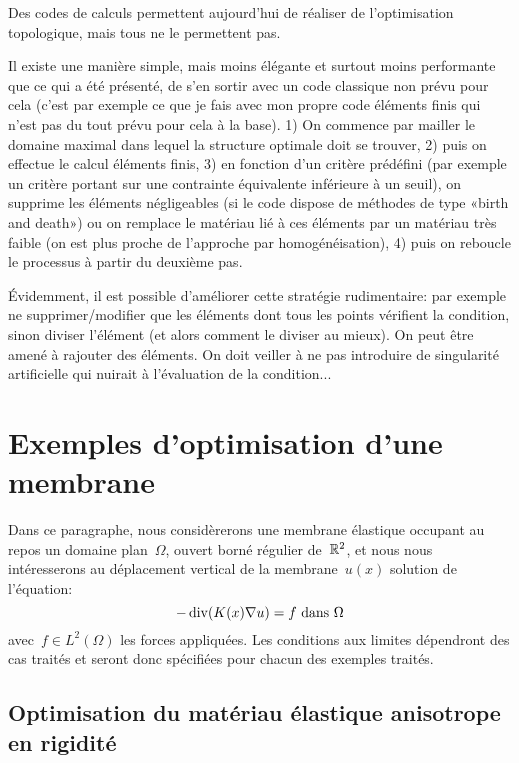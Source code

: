 \begin{remarque}
Des codes de calculs permettent aujourd'hui de réaliser de l'optimisation topologique, mais tous ne le permettent pas.

Il existe une manière simple, mais moins élégante et surtout moins performante que ce qui a été présenté, de s'en sortir avec un code classique non prévu pour cela (c'est par exemple ce que je fais avec mon propre code éléments finis qui n'est pas du tout prévu 
pour cela à la base).
1) On commence par mailler le domaine maximal dans lequel la structure optimale doit se trouver, 2) puis on effectue le calcul éléments finis, 3) en fonction d'un critère prédéfini (par exemple un critère portant sur une contrainte équivalente inférieure à un seuil), on supprime les éléments négligeables (si le code dispose de méthodes de type «birth and death») ou on remplace le matériau lié à ces éléments par un matériau très faible (on est plus proche de l'approche par homogénéisation), 4) puis on reboucle le processus à partir du deuxième pas. 

Évidemment, il est possible d'améliorer cette stratégie rudimentaire: par exemple ne supprimer/modifier que les éléments dont tous les points vérifient la condition, sinon diviser l'élément (et alors comment le diviser au mieux). On peut être amené à rajouter des éléments. On doit veiller à ne pas introduire de singularité artificielle qui nuirait à l'évaluation de la condition...
\end{remarque}

\medskip
\section{Exemples d'optimisation d'une membrane}

Dans ce paragraphe, nous considèrerons une membrane élastique occupant au repos un domaine plan~$\Omega$, ouvert borné régulier de~$\mathbb R^2$, et nous nous intéresserons au déplacement vertical de la membrane~$u(x)$ solution de l'équation:
\begin{equation}\label{Eq-PbMembrane}
-\operatorname{div}(K(x)\nabla u) = f \text{ dans }\Omega
\end{equation}
avec~$f\in L^2(\Omega)$ les forces appliquées.
Les conditions aux limites dépendront des cas traités et seront donc spécifiées pour chacun des exemples traités.

\medskip
\subsection{Optimisation du matériau élastique anisotrope en rigidité}

